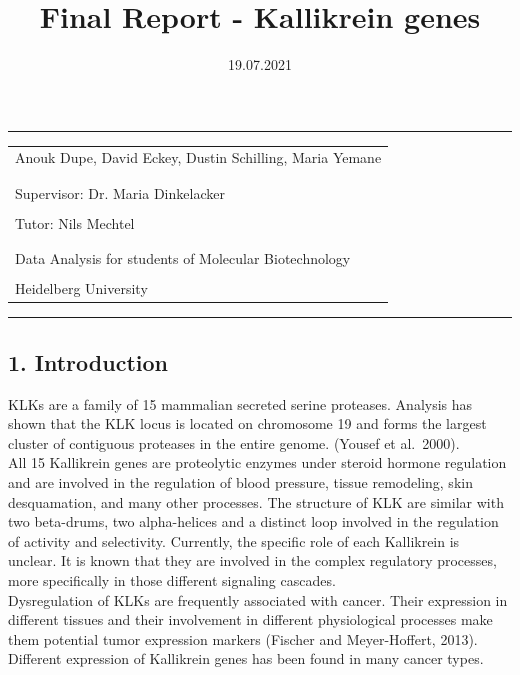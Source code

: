 \documentclass[
]{article}
\title{Final Report - Kallikrein genes}
\author{}
\date{\vspace{-2.5em}19.07.2021}
\begin{document}
\maketitle

\thispagestyle{empty}
\hrule
\vspace{0.3cm}
\begin{center}
    \vspace{1cm}
  \large
    \begin{tabular}[c]{l}
     \\

Anouk Dupe, David Eckey, Dustin Schilling, Maria Yemane \\
\\
     \\
    Supervisor:
    Dr. Maria Dinkelacker \\
     \\
    Tutor:
    Nils Mechtel \\
     \\
     \\
    Data Analysis for students of Molecular Biotechnology \\
    \\
    Heidelberg University 
    \vspace{0.3cm} \\
    \end{tabular}
    \end{center}

\begin{center}\rule{0.5\linewidth}{0.5pt}\end{center}

\pagebreak
\tableofcontents
\pagebreak
{}

\hypertarget{introduction}{%
\subsection{1. Introduction}\label{introduction}}

KLKs are a family of 15 mammalian secreted serine proteases. Analysis
has shown that the KLK locus is located on chromosome 19 and forms the
largest cluster of contiguous proteases in the entire genome. (Yousef et
al.~2000).\\
All 15 Kallikrein genes are proteolytic enzymes under steroid hormone
regulation and are involved in the regulation of blood pressure, tissue
remodeling, skin desquamation, and many other processes. The structure
of KLK are similar with two beta-drums, two alpha-helices and a distinct
loop involved in the regulation of activity and selectivity. Currently,
the specific role of each Kallikrein is unclear. It is known that they
are involved in the complex regulatory processes, more specifically in
those different signaling cascades.\\
Dysregulation of KLKs are frequently associated with cancer. Their
expression in different tissues and their involvement in different
physiological processes make them potential tumor expression markers
(Fischer and Meyer-Hoffert, 2013).\\
Different expression of Kallikrein genes has been found in many cancer
types.
\end{document}
